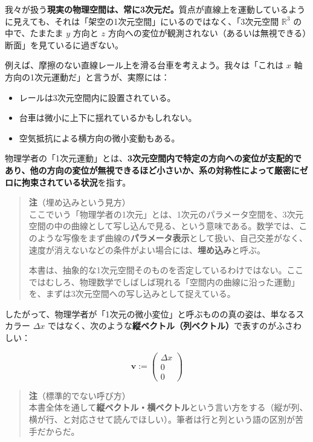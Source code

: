 \documentclass[a4paper,12pt,openany]{book}
\begin{document}
我々が扱う\textbf{現実の物理空間は、常に3次元だ。}質点が直線上を運動しているように見えても、それは「架空の1次元空間」にいるのではなく、「3次元空間
\(\mathbb{R}^3\) の中で、たまたま \(y\) 方向と \(z\)
方向への変位が観測されない（あるいは無視できる）断面」を見ているに過ぎない。

例えば、摩擦のない直線レール上を滑る台車を考えよう。我々は「これは \(x\)
軸方向の1次元運動だ」と言うが、実際には：

\begin{itemize}
\item
  レールは3次元空間内に設置されている。
\item
  台車は微小に上下に揺れているかもしれない。
\item
  空気抵抗による横方向の微小変動もある。
\end{itemize}

物理学者の「1次元運動」とは、\textbf{3次元空間内で特定の方向への変位が支配的であり、他の方向の変位が無視できるほど小さいか、系の対称性によって厳密にゼロに拘束されている状況}を指す。

\begin{quote}
\textbf{注}（埋め込みという見方）\\
ここでいう「物理学者の1次元」とは、1次元のパラメータ空間を、3次元空間の中の曲線として写し込んで見る、という意味である。数学では、このような写像をまず曲線の\textbf{パラメータ表示}として扱い、自己交差がなく、速度が消えないなどの条件がよい場合には、\textbf{埋め込み}と呼ぶ。

本書は、抽象的な1次元空間そのものを否定しているわけではない。ここではむしろ、物理数学でしばしば現れる「空間内の曲線に沿った運動」を、まずは3次元空間への写し込みとして捉えている。
\end{quote}

したがって、物理学者が「1次元の微小変位」と呼ぶものの真の姿は、単なるスカラー
\(\Delta x\)
ではなく、次のような\textbf{縦ベクトル（列ベクトル）}で表すのがふさわしい：

\[
\mathbf{v} :=
\begin{pmatrix}
\Delta x \\
0 \\
0
\end{pmatrix}
\]

\begin{quote}
\textbf{注}（標準的でない呼び方）\\
本書全体を通して\textbf{縦ベクトル・横ベクトル}という言い方をする（縦が列、横が行、と対応させて読んでほしい）。筆者は行と列という語の区別が苦手だからだ。
\end{quote}
\end{document}
